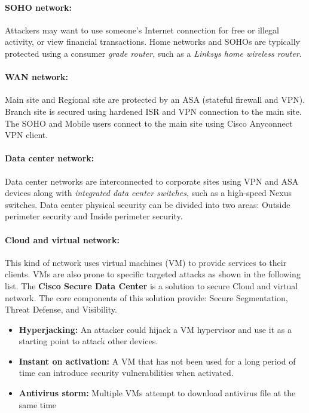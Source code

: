 \paragraph{SOHO network:} Attackers may want to use someone's Internet connection for free or illegal activity, or view financial transactions. Home networks and SOHOs are typically protected using a consumer \emph{grade router}, such as a \emph{Linksys home wireless router}. 

\paragraph{WAN network:} Main site and Regional site are protected by an ASA (stateful firewall and VPN). Branch site is secured using hardened ISR and VPN connection to the main site. The SOHO and Mobile users connect to the main site using Cisco Anyconnect VPN client. 

\paragraph{Data center network:} Data center networks are interconnected to corporate sites using VPN and ASA devices along with \emph{integrated data center switches}, such as a high-speed Nexus switches. Data center physical security can be divided into two areas: Outside perimeter security and Inside perimeter security. 

\paragraph{Cloud and virtual network:} This kind of network uses virtual machines (VM) to provide services to their clients.  VMs are also prone to specific targeted attacks as shown in the following list. The \textbf{Cisco Secure Data Center} is a solution to secure Cloud and virtual network. The core components of this solution provide: Secure Segmentation, Threat Defense, and Visibility.

\begin{itemize}
\item \textbf{Hyperjacking:} An attacker could hijack a VM hypervisor and use it as a starting point to attack other devices.
\item \textbf{Instant on activation:} A VM that has not been used for a long period of time can introduce security vulnerabilities when activated.
\item \textbf{Antivirus storm:} Multiple VMs attempt to download antivirus file at the same time
\end{itemize}

